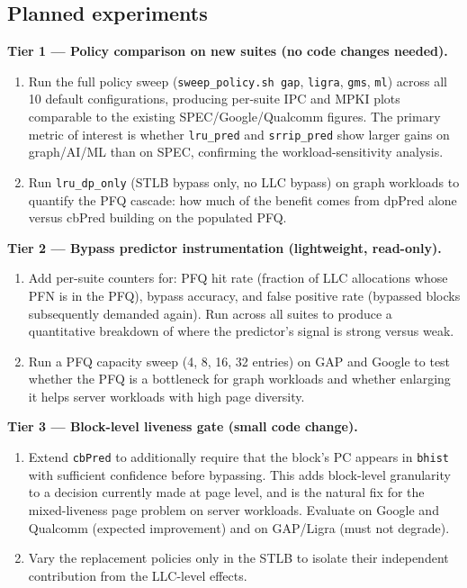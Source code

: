 \documentclass[12pt]{article}
\begin{document}
\subsection{Planned experiments}

\textbf{Tier 1 --- Policy comparison on new suites (no code changes needed).}
\begin{enumerate}
  \item Run the full policy sweep (\texttt{sweep\_policy.sh gap},
    \texttt{ligra}, \texttt{gms}, \texttt{ml}) across all 10 default
    configurations, producing per-suite IPC and MPKI plots comparable to
    the existing SPEC/Google/Qualcomm figures.
    The primary metric of interest is whether \texttt{lru\_pred} and
    \texttt{srrip\_pred} show larger gains on graph/AI/ML than on SPEC,
    confirming the workload-sensitivity analysis.
  \item Run \texttt{lru\_dp\_only} (STLB bypass only, no LLC bypass) on
    graph workloads to quantify the PFQ cascade: how much of the benefit
    comes from dpPred alone versus cbPred building on the populated PFQ.
\end{enumerate}

\textbf{Tier 2 --- Bypass predictor instrumentation (lightweight, read-only).}
\begin{enumerate}
  \item Add per-suite counters for: PFQ hit rate (fraction of LLC allocations
    whose PFN is in the PFQ), bypass accuracy, and false positive rate
    (bypassed blocks subsequently demanded again).
    Run across all suites to produce a quantitative breakdown of where the
    predictor's signal is strong versus weak.
  \item Run a PFQ capacity sweep (4, 8, 16, 32 entries) on GAP and Google
    to test whether the PFQ is a bottleneck for graph workloads and whether
    enlarging it helps server workloads with high page diversity.
\end{enumerate}

\textbf{Tier 3 --- Block-level liveness gate (small code change).}
\begin{enumerate}
  \item Extend \texttt{cbPred} to additionally require that the block's PC
    appears in \texttt{bhist} with sufficient confidence before bypassing.
    This adds block-level granularity to a decision currently made at page
    level, and is the natural fix for the mixed-liveness page problem on
    server workloads.
    Evaluate on Google and Qualcomm (expected improvement) and on GAP/Ligra
    (must not degrade).
  \item Vary the replacement policies only in the STLB to isolate their
    independent contribution from the LLC-level effects.
\end{enumerate}
\end{document}

